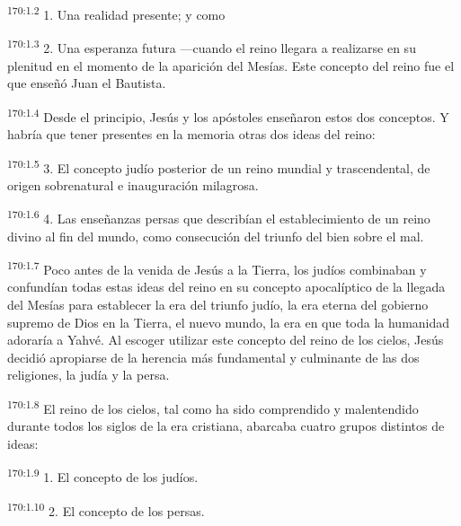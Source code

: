 \par 
\textsuperscript{170:1.2} 1. Una realidad presente; y como

\par 
\textsuperscript{170:1.3} 2. Una esperanza futura ---cuando el reino llegara a realizarse en su plenitud en el momento de la aparición del Mesías. Este concepto del reino fue el que enseñó Juan el Bautista.

\par 
\textsuperscript{170:1.4} Desde el principio, Jesús y los apóstoles enseñaron estos dos conceptos. Y habría que tener presentes en la memoria otras dos ideas del reino:

\par 
\textsuperscript{170:1.5} 3. El concepto judío posterior de un reino mundial y trascendental, de origen sobrenatural e inauguración milagrosa.

\par 
\textsuperscript{170:1.6} 4. Las enseñanzas persas que describían el establecimiento de un reino divino al fin del mundo, como consecución del triunfo del bien sobre el mal.

\par 
\textsuperscript{170:1.7} Poco antes de la venida de Jesús a la Tierra, los judíos combinaban y confundían todas estas ideas del reino en su concepto apocalíptico de la llegada del Mesías para establecer la era del triunfo judío, la era eterna del gobierno supremo de Dios en la Tierra, el nuevo mundo, la era en que toda la humanidad adoraría a Yahvé. Al escoger utilizar este concepto del reino de los cielos, Jesús decidió apropiarse de la herencia más fundamental y culminante de las dos religiones, la judía y la persa.

\par 
\textsuperscript{170:1.8} El reino de los cielos, tal como ha sido comprendido y malentendido durante todos los siglos de la era cristiana, abarcaba cuatro grupos distintos de ideas:

\par 
\textsuperscript{170:1.9} 1. El concepto de los judíos.

\par 
\textsuperscript{170:1.10} 2. El concepto de los persas.

